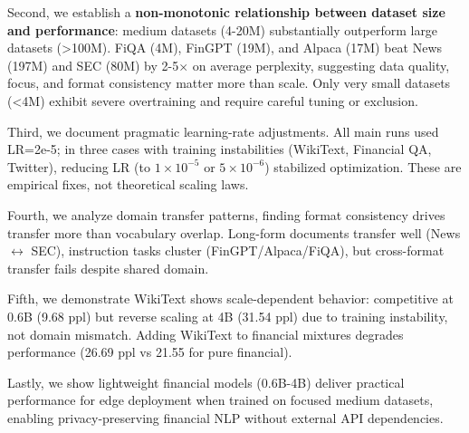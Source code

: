 Second, we establish a \textbf{non-monotonic relationship between dataset size and performance}: medium datasets (4-20M) substantially outperform large datasets (>100M). FiQA (4M), FinGPT (19M), and Alpaca (17M) beat News (197M) and SEC (80M) by 2-5$\times$ on average perplexity, suggesting data quality, focus, and format consistency matter more than scale. Only very small datasets (<4M) exhibit severe overtraining and require careful tuning or exclusion.

Third, we document pragmatic learning-rate adjustments. All main runs used LR=2e-5; in three cases with training instabilities (WikiText, Financial QA, Twitter), reducing LR (to $1\times10^{-5}$ or $5\times10^{-6}$) stabilized optimization. These are empirical fixes, not theoretical scaling laws.

Fourth, we analyze domain transfer patterns, finding format consistency drives transfer more than vocabulary overlap. Long-form documents transfer well (News $\leftrightarrow$ SEC), instruction tasks cluster (FinGPT/Alpaca/FiQA), but cross-format transfer fails despite shared domain.

Fifth, we demonstrate WikiText shows scale-dependent behavior: competitive at 0.6B (9.68 ppl) but reverse scaling at 4B (31.54 ppl) due to training instability, not domain mismatch. Adding WikiText to financial mixtures degrades performance (26.69 ppl vs 21.55 for pure financial).

Lastly, we show lightweight financial models (0.6B-4B) deliver practical performance for edge deployment when trained on focused medium datasets, enabling privacy-preserving financial NLP without external API dependencies.
